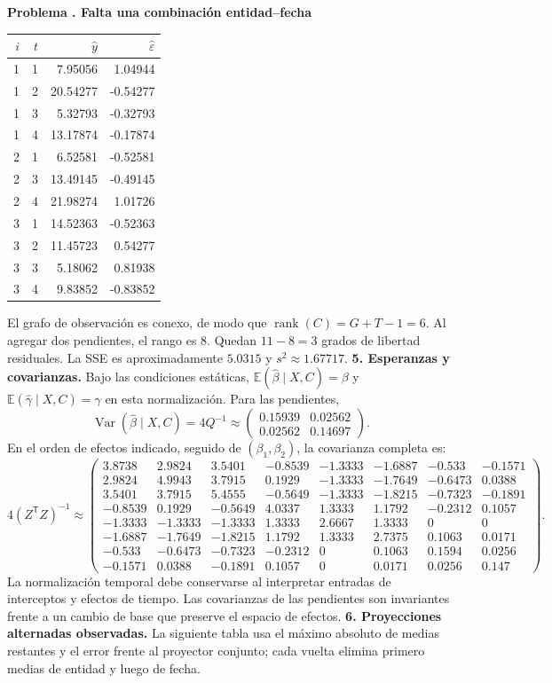 \documentclass[11pt,a4paper]{article}
\newcommand{\E}{\mathbb E}
\newcommand{\T}{^{\mathsf T}}
\DeclareMathOperator{\Var}{Var}
\DeclareMathOperator{\rank}{rank}
\theoremstyle{definition}
\newcounter{problema}
\newenvironment{resuelto}[1]{\refstepcounter{problema}\par\medskip\Needspace{6\baselineskip}\textbf{Problema \theproblema. #1}\par}{\par\medskip}
\newcommand{\eps}{\varepsilon}
\begin{document}
\begin{resuelto}{Falta una combinación entidad--fecha}
\begin{center}\small
\begin{tabular}{rrrr}
\toprule
$i$&$t$&$\widehat y$&$\widehat\eps$\\
\midrule
1&1&7.95056&1.04944\\
1&2&20.54277&-0.54277\\
1&3&5.32793&-0.32793\\
1&4&13.17874&-0.17874\\
2&1&6.52581&-0.52581\\
2&3&13.49145&-0.49145\\
2&4&21.98274&1.01726\\
3&1&14.52363&-0.52363\\
3&2&11.45723&0.54277\\
3&3&5.18062&0.81938\\
3&4&9.83852&-0.83852\\
\bottomrule
\end{tabular}
\end{center}
El grafo de observación es conexo, de modo que $\rank(C)=G+T-1=6$. Al agregar dos pendientes, el rango es $8$. Quedan $11-8=3$ grados de libertad residuales. La SSE es aproximadamente $5.0315$ y $s^2\approx1.67717$.
\textbf{5. Esperanzas y covarianzas.} Bajo las condiciones estáticas, $\E(\widehat\beta\mid X,C)=\beta$ y $\E(\widehat\gamma\mid X,C)=\gamma$ en esta normalización. Para las pendientes,
\[
\Var(\widehat\beta\mid X,C)=4Q^{-1}\approx\begin{pmatrix}
0.15939&0.02562\\0.02562&0.14697
\end{pmatrix}.
\]
En el orden de efectos indicado, seguido de $(\beta_1,\beta_2)$, la covarianza completa es:
{\small
\[
4(Z\T Z)^{-1}\approx\begin{pmatrix}
3.8738&2.9824&3.5401&-0.8539&-1.3333&-1.6887&-0.533&-0.1571\\2.9824&4.9943&3.7915&0.1929&-1.3333&-1.7649&-0.6473&0.0388\\3.5401&3.7915&5.4555&-0.5649&-1.3333&-1.8215&-0.7323&-0.1891\\-0.8539&0.1929&-0.5649&4.0337&1.3333&1.1792&-0.2312&0.1057\\-1.3333&-1.3333&-1.3333&1.3333&2.6667&1.3333&0&0\\-1.6887&-1.7649&-1.8215&1.1792&1.3333&2.7375&0.1063&0.0171\\-0.533&-0.6473&-0.7323&-0.2312&0&0.1063&0.1594&0.0256\\-0.1571&0.0388&-0.1891&0.1057&0&0.0171&0.0256&0.147
\end{pmatrix}.
\]
}
La normalización temporal debe conservarse al interpretar entradas de interceptos y efectos de tiempo. Las covarianzas de las pendientes son invariantes frente a un cambio de base que preserve el espacio de efectos.
\textbf{6. Proyecciones alternadas observadas.} La siguiente tabla usa el máximo absoluto de medias restantes y el error frente al proyector conjunto; cada vuelta elimina primero medias de entidad y luego de fecha.


\end{resuelto}
\end{document}
